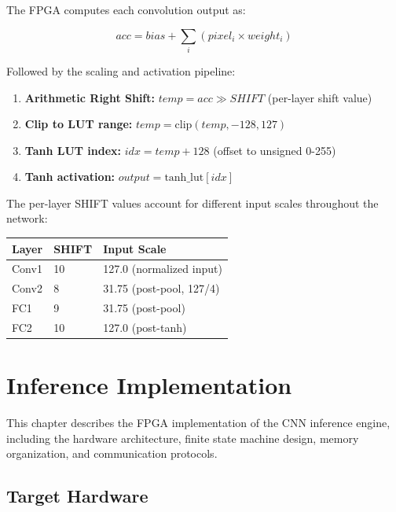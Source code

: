 \documentclass[12pt,a4paper]{report}
\begin{document}
The FPGA computes each convolution output as:

\begin{equation}
acc = bias + \sum_{i} (pixel_i \times weight_i)
\end{equation}

Followed by the scaling and activation pipeline:

\begin{enumerate}
    \item \textbf{Arithmetic Right Shift:} $temp = acc \gg SHIFT$ (per-layer shift value)
    \item \textbf{Clip to LUT range:} $temp = \text{clip}(temp, -128, 127)$
    \item \textbf{Tanh LUT index:} $idx = temp + 128$ (offset to unsigned 0-255)
    \item \textbf{Tanh activation:} $output = \text{tanh\_lut}[idx]$
\end{enumerate}

The per-layer SHIFT values account for different input scales throughout the network:

\begin{table}[H]
\centering
\begin{tabular}{lll}
\toprule
\textbf{Layer} & \textbf{SHIFT} & \textbf{Input Scale} \\
\midrule
Conv1 & 10 & 127.0 (normalized input) \\
Conv2 & 8 & 31.75 (post-pool, 127/4) \\
FC1 & 9 & 31.75 (post-pool) \\
FC2 & 10 & 127.0 (post-tanh) \\
\bottomrule
\end{tabular}
\end{table}

\chapter{Inference Implementation}

This chapter describes the FPGA implementation of the CNN inference engine, including the hardware architecture, finite state machine design, memory organization, and communication protocols.

\section{Target Hardware}
\end{document}
